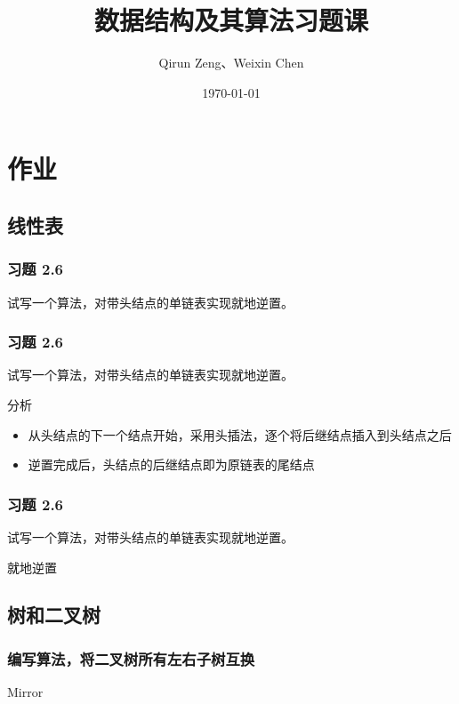 \documentclass{beamer}
\author{Qirun Zeng、Weixin Chen}
\date{\today}
\title{数据结构及其算法习题课}
\begin{document}
    \begin{frame}
        \titlepage
    \end{frame}

    \section{作业}

    \subsection{线性表}

    \begin{frame}
        \frametitle{习题 2.6}
        试写一个算法，对带头结点的单链表实现就地逆置。
    \end{frame}

    \begin{frame}
        \frametitle{习题 2.6}
        试写一个算法，对带头结点的单链表实现就地逆置。
        \begin{block}{分析}
            \begin{itemize}
                \item<1-> 从头结点的下一个结点开始，采用头插法，逐个将后继结点插入到头结点之后
                \item<2-> 逆置完成后，头结点的后继结点即为原链表的尾结点
            \end{itemize}
        \end{block}
    \end{frame}

    \begin{frame}
        \frametitle{习题 2.6}
        试写一个算法，对带头结点的单链表实现就地逆置。
        \begin{algorithm}[H]
            \caption{就地逆置}
        \end{algorithm}
    \end{frame}

    \subsection{树和二叉树}
    \begin{frame}
        \frametitle{编写算法，将二叉树所有左右子树互换}
        \begin{algorithm}[H]
            \caption{Mirror}
        \end{algorithm}
    \end{frame}
\end{document}
